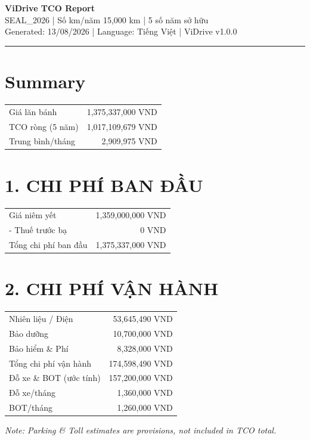 \documentclass[11pt,a4paper]{article}
\begin{document}
\thispagestyle{empty}

\begin{center}
    {\LARGE \textbf{\color{ViDriveBlue} ViDrive TCO Report}}\\[0.3cm]
    {\Large SEAL\_2026 | Số km/năm 15,000 km | 5 số năm sở hữu}\\[0.2cm]
    {\normalsize Generated: 13/08/2026 | Language: Tiếng Việt | ViDrive v1.0.0}
\end{center}
\vspace{0.5cm}
\hrule
\vspace{0.5cm}
\section*{Summary}
\begin{tabular}{l r}
\toprule
Giá lăn bánh & 1,375,337,000 VND \\
TCO ròng (5 năm) & 1,017,109,679 VND \\
Trung bình/tháng & 2,909,975 VND \\
\bottomrule
\end{tabular}
\vspace{0.3cm}\section*{1. CHI PHÍ BAN ĐẦU}
\begin{tabular}{l r}
\toprule
Giá niêm yết & 1,359,000,000 VND \\
 - Thuế trước bạ & 0 VND \\
Tổng chi phí ban đầu & 1,375,337,000 VND \\
\bottomrule
\end{tabular}
\vspace{0.3cm}\section*{2. CHI PHÍ VẬN HÀNH}
\begin{tabular}{l r}
\toprule
Nhiên liệu / Điện & 53,645,490 VND \\
Bảo dưỡng & 10,700,000 VND \\
Bảo hiểm \& Phí & 8,328,000 VND \\
Tổng chi phí vận hành & 174,598,490 VND \\
Đỗ xe \& BOT (ước tính) & 157,200,000 VND \\
  Đỗ xe/tháng & 1,360,000 VND \\
  BOT/tháng & 1,260,000 VND \\
\bottomrule
\end{tabular}
\vspace{0.3cm}\textit{Note: Parking \& Toll estimates are provisions, not included in TCO total.}
\end{document}
